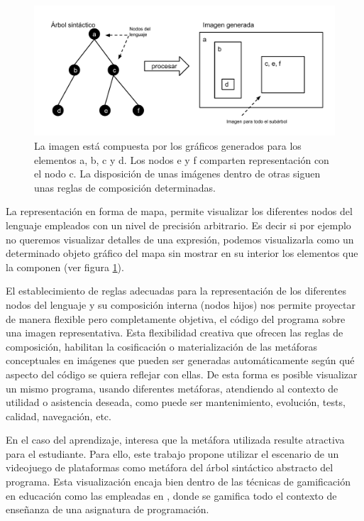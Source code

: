 \documentclass{llncs}
\begin{document}
\begin{figure}[ht]
\begin{center}
\includegraphics[scale=0.5]{images/arbol-mapa.pdf}
\caption{La imagen está compuesta por los gráficos generados para los elementos a, b, c y d. Los nodos e y f comparten representación con el nodo c. La disposición de unas imágenes dentro de otras siguen unas reglas de composición determinadas.
\label{fig:arbolmapa}}
\end{center}
\end{figure}

La representación en forma de mapa, permite visualizar los diferentes nodos del lenguaje empleados con un nivel de precisión arbitrario. Es decir si por ejemplo no queremos visualizar detalles de una expresión, podemos visualizarla como un determinado objeto gráfico del mapa sin mostrar en su interior los elementos que la componen (ver figura \ref{fig:arbolmapa}).

El establecimiento de reglas adecuadas para la representación de los diferentes nodos del lenguaje y su composición interna (nodos hijos) nos permite proyectar de manera flexible pero completamente objetiva, el código del programa sobre una imagen representativa. Esta flexibilidad creativa que ofrecen las reglas de composición, habilitan la cosificación o materialización de las metáforas conceptuales \cite{travers1996programming} en imágenes que pueden ser generadas automáticamente según qué aspecto del código se quiera reflejar con ellas. De esta forma es posible visualizar un mismo programa, usando diferentes metáforas, atendiendo al contexto de utilidad o asistencia deseada, como puede ser mantenimiento, evolución, tests, calidad, navegación, etc.

En el caso del aprendizaje, interesa que la metáfora utilizada resulte atractiva para el estudiante. Para ello, este trabajo propone utilizar el escenario de un videojuego de plataformas como metáfora del árbol sintáctico abstracto del programa. Esta visualización encaja bien dentro de las técnicas de gamificación en educación como las empleadas en \cite{kumar2012gamification}, donde se gamifica todo el contexto de enseñanza de una asignatura de programación. 
\end{document}
